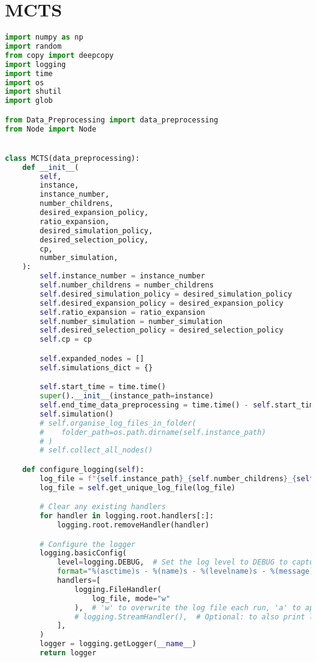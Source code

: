 \section{MCTS}

\begin{lstlisting}[language = Python]
    import numpy as np
import random
from copy import deepcopy
import logging
import time
import os
import shutil
import glob

from Data_Preprocessing import data_preprocessing
from Node import Node


class MCTS(data_preprocessing):
    def __init__(
        self,
        instance,
        instance_number,
        number_childrens,
        desired_expansion_policy,
        ratio_expansion,
        desired_simulation_policy,
        desired_selection_policy,
        cp,
        number_simulation,
    ):
        self.instance_number = instance_number
        self.number_childrens = number_childrens
        self.desired_simulation_policy = desired_simulation_policy
        self.desired_expansion_policy = desired_expansion_policy
        self.ratio_expansion = ratio_expansion
        self.number_simulation = number_simulation
        self.desired_selection_policy = desired_selection_policy
        self.cp = cp

        self.expanded_nodes = []
        self.simulations_dict = {}

        self.start_time = time.time()
        super().__init__(instance_path=instance)
        self.end_time_data_preprocessing = time.time() - self.start_time
        self.simulation()
        # self.organise_log_files_in_folder(
        #    folder_path=os.path.dirname(self.instance_path)
        # )
        # self.collect_all_nodes()

    def configure_logging(self):
        log_file = f"{self.instance_path}_{self.number_childrens}_{self.desired_simulation_policy}_{self.desired_expansion_policy}_{self.ratio_expansion}_{self.number_simulation}_{self.desired_selection_policy}_{self.cp}.log"
        log_file = self.get_unique_log_file(log_file)

        # Clear any existing handlers
        for handler in logging.root.handlers[:]:
            logging.root.removeHandler(handler)

        # Configure the logger
        logging.basicConfig(
            level=logging.DEBUG,  # Set the log level to DEBUG to capture all types of logs
            format="%(asctime)s - %(name)s - %(levelname)s - %(message)s",
            handlers=[
                logging.FileHandler(
                    log_file, mode="w"
                ),  # 'w' to overwrite the log file each run, 'a' to append
                # logging.StreamHandler(),  # Optional: to also print logs to the console
            ],
        )
        logger = logging.getLogger(__name__)
        return logger


\end{lstlisting}
